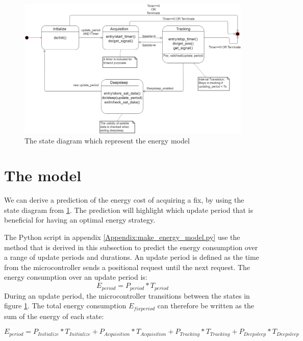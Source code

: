 \begin{figure}[h]
\centering
\includegraphics[width=15 cm]{Project_Report/Images/Energymodel.png}
\caption{The state diagram which represent the energy model}
\label{fig:GPS energymodel}
\end{figure}

\section{The model}
We can derive a prediction of the energy cost of acquiring a fix, by using the state diagram from \ref{fig:GPS energymodel}. The prediction will highlight which update period that is beneficial for having an optimal energy strategy. 
 
The Python script in appendix \ref{Appendix:make_energy_model.py} use the method that is derived in this subsection to predict the energy consumption over a range of update periods and durations. An update period is defined as the time from the microcontroller sends a positional request until the next request. The energy consumption over an update period is:
\begin{equation}
E_{period} = P_{period}*T_{period}
\end{equation}
\label{equation:general}
During an update period, the microcontroller transitions between the states in figure \ref{fig:GPS energymodel}. The total energy consumption $E_{fixperiod}$ can therefore be written as the sum of the energy of each state:

\begin{equation}
E_{period} = P_{Initialize}*T_{Initialize} + P_{Acquisition}*T_{Acquisition} + P_{Tracking}*T_{Tracking} + P_{Deepsleep}*T_{Deepsleep}
\end{equation}
\label{equation:energyperiod}

